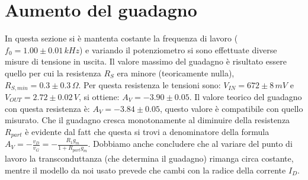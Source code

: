 \documentclass[10pt,a4paper]{article}
\begin{document}
\section{Aumento del guadagno}
In questa sezione si è mantenta costante la frequenza di lavoro ($f_0 = 1.00\pm0.01\, kHz$) e variando il potenziometro si sono effettuate diverse misure di tensione in uscita. Il valore massimo del guadagno è risultato essere quello per cui la resistenza $R_S$ era minore (teoricamente nulla), $R_{S, min} = 0.3 \pm 0.3 \, \Omega$. Per questa resistenza le tensioni  sono: $V_{IN} = 672\pm8 \, mV$ e $V_{OUT} = 2.72 \pm 0.02 \, V$, si ottiene:  $A_V = -3.90\pm0.05$.
Il valore teorico del guadagno con questa resistenza è:  $A_V =-3.84\pm0.05$, questo valore è compatibile con quello misurato.
Che il guadagno cresca monotonamente al diminuire della resistenza $R_{part}$ è evidente dal fatt che questa si trovi a denominatore della formula $A_V = -\frac{v_D}{v_G} = - \frac{R_1 g_m}{1+R_{part} g_m}$. Dobbiamo anche concludere che al variare del punto di lavoro la transconduttanza (che determina il guadagno) rimanga circa costante, mentre il modello da noi usato prevede che cambi con la radice della corrente $I_D$.
\end{document}
